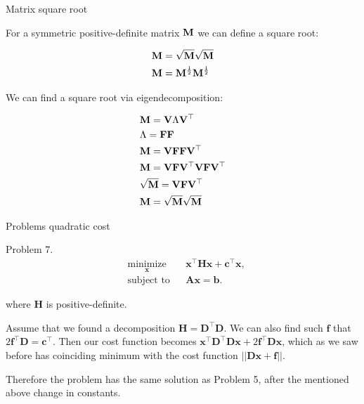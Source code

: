\documentclass{beamer}
\begin{document}
\begin{frame}{Matrix square root}
	\begin{flushleft}
		
		For a symmetric positive-definite matrix $\mathbf{M}$ we can define a square root:
		
		\begin{align}
			\mathbf{M} &= \sqrt{\mathbf{M} } \sqrt{\mathbf{M} }
			\\
			\mathbf{M} &= \mathbf{M}^\frac{1}{2} \mathbf{M}^\frac{1}{2}
		\end{align}
		
		We can find a square root via eigendecomposition:
		
		\begin{align}
			& \mathbf{M} = \mathbf{V} \Lambda \mathbf{V}^\top 
			\\
			&  \Lambda =  \mathbf{F} \mathbf{F}
			\\
			& \mathbf{M} = \mathbf{V} \mathbf{F} \mathbf{F} \mathbf{V}^\top 
			\\
			& \mathbf{M} = \mathbf{V} \mathbf{F} \mathbf{V}^\top\mathbf{V}  \mathbf{F} \mathbf{V}^\top 
			\\
			& \sqrt{\mathbf{M} }  = \mathbf{V} \mathbf{F} \mathbf{V}^\top
			\\
			&\mathbf{M} = \sqrt{\mathbf{M} } \sqrt{\mathbf{M} } 
		\end{align}
		
		
		
	\end{flushleft}
\end{frame}




\begin{frame}{Problems quadratic cost}
\begin{flushleft}

Problem 7. 
%
\begin{equation}
\begin{aligned}
& \underset{\mathbf{x}}{\text{minimize}}
& & \mathbf{x}^\top \mathbf{H} \mathbf{x} + \mathbf{c}^\top\mathbf{x}, \\
& \text{subject to}
& & \mathbf{A} \mathbf{x} = \mathbf{b}.
\end{aligned}
\end{equation}

where $\mathbf{H}$ is positive-definite.

\bigskip

Assume that we found a decomposition $\mathbf{H} = \mathbf{D}^\top\mathbf{D}$. We can also find such $\mathbf{f}$ that $2\mathbf{f}^\top\mathbf{D} = \mathbf{c}^\top$. Then our cost function becomes $\mathbf{x}^\top \mathbf{D}^\top\mathbf{D} \mathbf{x} + 2\mathbf{f}^\top\mathbf{D}\mathbf{x}$, which as we saw before has coinciding minimum with the cost function $||\mathbf{D}\mathbf{x} + \mathbf{f}||$.

\bigskip

Therefore the problem has the same solution as Problem 5, after the mentioned above change in constants.

\end{flushleft}
\end{frame}
\end{document}

